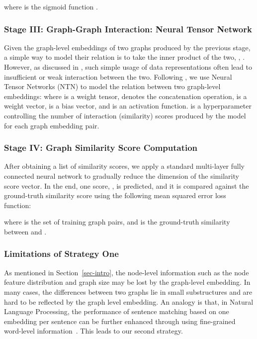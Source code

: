 \documentclass[sigconf]{acmart}
\begin{document}
where  is the sigmoid function .

\subsubsection{Stage III: Graph-Graph Interaction: Neural Tensor Network}
Given the graph-level embeddings of two graphs produced by the previous stage, a simple way to model their relation is to take the inner product of the two, , . However, as discussed in \cite{socher2013reasoning}, such simple usage of data representations often lead to insufficient or weak interaction between the two. Following \cite{socher2013reasoning}, we use Neural Tensor Networks (NTN) to model the relation between two graph-level embeddings:
where  is a weight tensor,  denotes the concatenation operation,  is a weight vector,  is a bias vector, and  is an activation function.  is a hyperparameter controlling the number of interaction (similarity) scores produced by the model for each graph embedding pair. 

\subsubsection{Stage IV: Graph Similarity Score Computation}
\label{subsec-gsp}

After obtaining a list of similarity scores, we apply a standard multi-layer fully connected neural network to gradually reduce the dimension of the similarity score vector. In the end, one score, , is predicted, and it is compared against the ground-truth similarity score using the following mean squared error loss function:


where  is the set of training graph pairs, and  is the ground-truth similarity between  and .

\subsubsection{Limitations of Strategy One}
As mentioned in Section~\ref{sec-intro}, the node-level information such as the node feature distribution and graph size may be lost by the graph-level embedding. In many cases, the differences between two graphs lie in small substructures and are hard to be reflected by the graph level embedding. 
An analogy is that, in Natural Language Processing, the performance of sentence matching based on one embedding per sentence can be further enhanced through using fine-grained word-level information~\cite{hu2014convolutional,he2016pairwise}. This leads to our second strategy.
\end{document}
